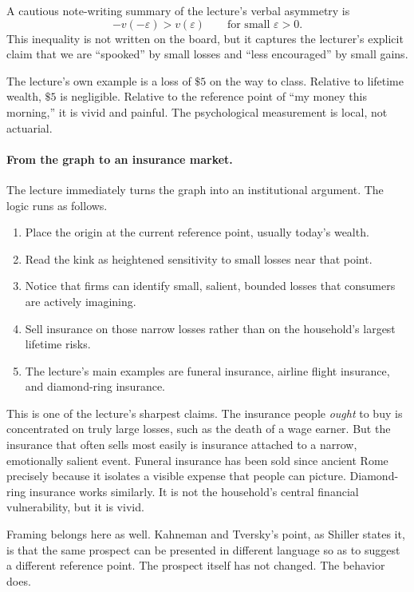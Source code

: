 A cautious note-writing summary of the lecture's verbal asymmetry is
\begin{equation}
-v(-\varepsilon)>v(\varepsilon)
\qquad \text{for small } \varepsilon>0.
\end{equation}
This inequality is not written on the board, but it captures the lecturer's explicit claim that we are ``spooked'' by small losses and ``less encouraged'' by small gains.

The lecture's own example is a loss of \(\$5\) on the way to class. Relative to lifetime wealth, \(\$5\) is negligible. Relative to the reference point of ``my money this morning,'' it is vivid and painful. The psychological measurement is local, not actuarial.

\paragraph{From the graph to an insurance market.} The lecture immediately turns the graph into an institutional argument. The logic runs as follows.

\begin{enumerate}
\item Place the origin at the current reference point, usually today's wealth.
\item Read the kink as heightened sensitivity to small losses near that point.
\item Notice that firms can identify small, salient, bounded losses that consumers are actively imagining.
\item Sell insurance on those narrow losses rather than on the household's largest lifetime risks.
\item The lecture's main examples are funeral insurance, airline flight insurance, and diamond-ring insurance.
\end{enumerate}

This is one of the lecture's sharpest claims. The insurance people \emph{ought} to buy is concentrated on truly large losses, such as the death of a wage earner. But the insurance that often sells most easily is insurance attached to a narrow, emotionally salient event. Funeral insurance has been sold since ancient Rome precisely because it isolates a visible expense that people can picture. Diamond-ring insurance works similarly. It is not the household's central financial vulnerability, but it is vivid.

Framing belongs here as well. Kahneman and Tversky's point, as Shiller states it, is that the same prospect can be presented in different language so as to suggest a different reference point. The prospect itself has not changed. The behavior does.

